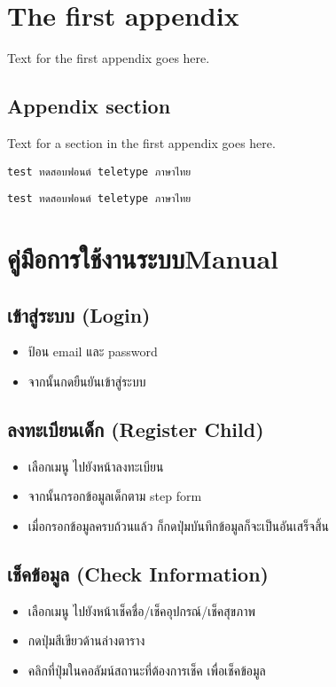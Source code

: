 \chapter{The first appendix}

Text for the first appendix goes here.

\section{Appendix section}

Text for a section in the first appendix goes here.

\verb+test ทดสอบฟอนต์ teletype ภาษาไทย+

\texttt{test ทดสอบฟอนต์ teletype ภาษาไทย}

\chapter{\ifcpe คู่มือการใช้งานระบบ\else Manual\fi}

\section{เข้าสู่ระบบ (Login)}
\begin{itemize}
    \item ป้อน email และ password 
    \item จากนั้นกดยืนยันเข้าสู่ระบบ 
\end{itemize}

\section{ลงทะเบียนเด็ก (Register Child)}
\begin{itemize}
    \item เลือกเมนู ไปยังหน้าลงทะเบียน
    \item จากนั้นกรอกข้อมูลเด็กตาม step form 
    \item เมื่อกรอกข้อมูลครบถ้วนแล้ว ก็กดปุ่มบันทึกข้อมูลก็จะเป็นอันเสร็จสิ้น
\end{itemize}

\section{เช็คข้อมูล (Check Information)}
\begin{itemize}
    \item เลือกเมนู ไปยังหน้าเช็คชื่อ/เช็คอุปกรณ์/เช็คสุขภาพ
    \item กดปุ่มสีเขียวด้านล่างตาราง
    \item คลิกที่ปุ่มในคอลัมน์สถานะที่ต้องการเช็ค เพื่อเช็คข้อมูล
\end{itemize}

